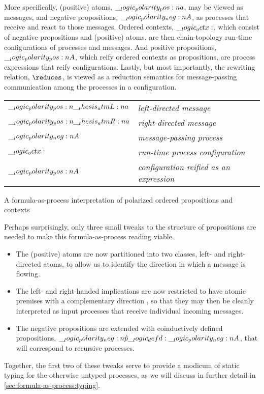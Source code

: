 More specifically,
(positive) atoms, $\__logic_polarity_pos:n {a}$, may be viewed as messages, and negative propositions, $\__logic_polarity_neg:n {A}$, as processes that receive and react to those messages.
Ordered contexts, $\__logic_octx:$, which consist of negative propositions and (positive) atoms, are then chain-topology run-time configurations of processes and messages.
And positive propositions, $\__logic_polarity_pos:n {A}$, which reify ordered contexts as propositions, are process expressions that reify configurations.
Lastly, but most importantly, the rewriting relation, $\reduces$, is viewed as a reduction semantics for message-passing communication among the processes in a configuration.%
\begin{margintable}
  \begin{center}
    \begin{tabular}{@{}l@{\enspace\ }>{\itshape}l@{}}
      $\__logic_polarity_pos:n {\__thesis_atmL:n {a}}$ & left-directed message \\
      $\__logic_polarity_pos:n {\__thesis_atmR:n {a}}$ & right-directed message \\
      $\__logic_polarity_neg:n {A}$ & message-passing process \\
      $\__logic_octx:$ & run-time process configuration \\
      $\__logic_polarity_pos:n {A}$ & configuration reified as an expression
    \end{tabular}
  \end{center}
  \caption{A formula-as-process interpretation of polarized ordered propositions and contexts}\label{fig:choreographies:propctx-table}
\end{margintable}%

Perhaps surprisingly, only three small tweaks to the structure of propositions are needed to make this formula-as-process reading viable.
\begin{itemize}
\item
  The (positive) atoms are now partitioned into two classes, left- and right-directed atoms, to allow us to identify the direction in which a message is flowing.

\item
  The left- and right-handed implications are now restricted to have atomic premises with a complementary direction
  , so that they may then be cleanly interpreted as input processes that receive  individual incoming messages.

\item 
  The negative propositions are extended with coinductively defined propositions, $\__logic_polarity_neg:n {\hat{p}} \__logic_defd: \__logic_polarity_neg:n {A}$, that will correspond to recursive processes.
\end{itemize}
Together, the first two of these tweaks serve to provide a modicum of static typing for the otherwise untyped processes, as we will discuss in further detail in \cref{sec:formula-as-process:typing}.

